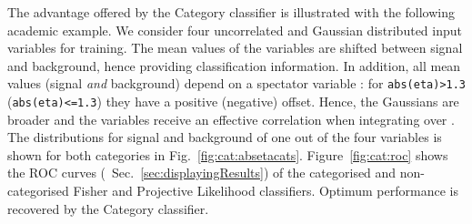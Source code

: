 The advantage offered by the Category classifier is illustrated with the following 
academic example. We consider four uncorrelated and Gaussian distributed input 
variables for training. The mean values of the variables are shifted between signal 
and background, hence providing classification information. In addition, all mean 
values (signal {\em and} background) depend on a spectator variable : for 
{\tt abs(eta)>1.3} ({\tt abs(eta)<=1.3}) they have a positive (negative) offset. 
Hence, the Gaussians are broader and the variables receive an effective correlation
when integrating over . The distributions for signal and background of 
one out of the four variables is shown for both  categories in 
Fig.~\ref{fig:cat:absetacats}. Figure~\ref{fig:cat:roc} shows the ROC curves
(\cf\  Sec.~\ref{sec:displayingResults}) of the categorised and non-categorised
Fisher and Projective Likelihood classifiers. Optimum performance is recovered 
by the Category classifier. 
